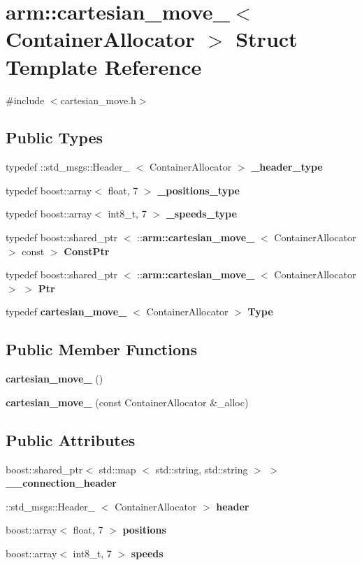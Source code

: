 \section{arm\-:\-:cartesian\-\_\-move\-\_\-$<$ \-Container\-Allocator $>$ \-Struct \-Template \-Reference}
\label{structarm_1_1cartesian__move__}


{\ttfamily \#include $<$cartesian\-\_\-move.\-h$>$}

\subsection*{\-Public \-Types}
\begin{DoxyCompactItemize}
\item 
typedef \-::std\-\_\-msgs\-::\-Header\-\_\-\*
$<$ \-Container\-Allocator $>$ {\bf \-\_\-header\-\_\-type}
\item 
typedef boost\-::array$<$ float, 7 $>$ {\bf \-\_\-positions\-\_\-type}
\item 
typedef boost\-::array$<$ int8\-\_\-t, 7 $>$ {\bf \-\_\-speeds\-\_\-type}
\item 
typedef boost\-::shared\-\_\-ptr\*
$<$ \-::{\bf arm\-::cartesian\-\_\-move\-\_\-}\*
$<$ \-Container\-Allocator $>$ const  $>$ {\bf \-Const\-Ptr}
\item 
typedef boost\-::shared\-\_\-ptr\*
$<$ \-::{\bf arm\-::cartesian\-\_\-move\-\_\-}\*
$<$ \-Container\-Allocator $>$ $>$ {\bf \-Ptr}
\item 
typedef {\bf cartesian\-\_\-move\-\_\-}\*
$<$ \-Container\-Allocator $>$ {\bf \-Type}
\end{DoxyCompactItemize}
\subsection*{\-Public \-Member \-Functions}
\begin{DoxyCompactItemize}
\item 
{\bf cartesian\-\_\-move\-\_\-} ()
\item 
{\bf cartesian\-\_\-move\-\_\-} (const \-Container\-Allocator \&\-\_\-alloc)
\end{DoxyCompactItemize}
\subsection*{\-Public \-Attributes}
\begin{DoxyCompactItemize}
\item 
boost\-::shared\-\_\-ptr$<$ std\-::map\*
$<$ std\-::string, std\-::string $>$ $>$ {\bf \-\_\-\-\_\-connection\-\_\-header}
\item 
\-::std\-\_\-msgs\-::\-Header\-\_\-\*
$<$ \-Container\-Allocator $>$ {\bf header}
\item 
boost\-::array$<$ float, 7 $>$ {\bf positions}
\item 
boost\-::array$<$ int8\-\_\-t, 7 $>$ {\bf speeds}
\end{DoxyCompactItemize}


